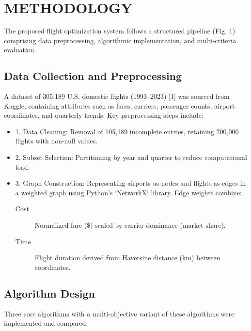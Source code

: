 \documentclass[conference]{IEEEtran}
\begin{document}
\section{METHODOLOGY}
The proposed flight optimization system follows a structured pipeline (Fig. 1) comprising data preprocessing, algorithmic implementation, and multi-criteria evaluation.  
\subsection{Data Collection and Preprocessing}
A dataset of 305,189 U.S. domestic flights (1993–2023) [1] was sourced from Kaggle, containing attributes such as fares, carriers, passenger counts, airport coordinates, and quarterly trends. Key preprocessing steps include:  
\begin{itemize}
    \item 1. Data Cleaning: Removal of 105,189 incomplete entries, retaining 200,000 flights with non-null values.  
    \item 2. Subset Selection: Partitioning by year and quarter to reduce computational load.  
    \item 3. Graph Construction: Representing airports as nodes and flights as edges in a weighted graph using Python’s `NetworkX` library. Edge weights combine:  
    \begin{description}
        \item [Cost] Normalized fare (\$) scaled by carrier dominance (market share).  
        \item [Time] Flight duration derived from Haversine distance (km) between coordinates.  
    \end{description}   

\end{itemize}

\subsection{Algorithm Design} 
Three core algorithms with a multi-objective variant of these algorithms were implemented and compared:  
\end{document}
